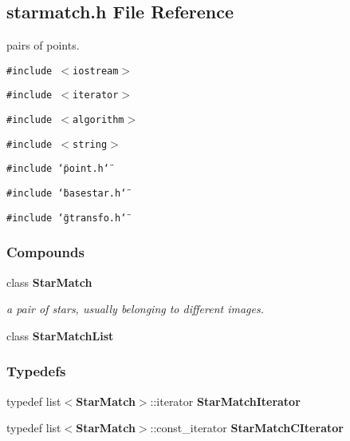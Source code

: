 \subsection{starmatch.h File Reference}
\label{starmatch_h}
pairs of points. 


{\tt \#include $<$iostream$>$}\par
{\tt \#include $<$iterator$>$}\par
{\tt \#include $<$algorithm$>$}\par
{\tt \#include $<$string$>$}\par
{\tt \#include \char`\"{}point.h\char`\"{}}\par
{\tt \#include \char`\"{}basestar.h\char`\"{}}\par
{\tt \#include \char`\"{}gtransfo.h\char`\"{}}\par
\subsubsection*{Compounds}
\begin{CompactItemize}
\item 
class {\bf Star\-Match}
\begin{CompactList}\small\item\em a pair of stars, usually belonging to different images.\item\end{CompactList}\item 
class {\bf Star\-Match\-List}
\end{CompactItemize}
\subsubsection*{Typedefs}
\begin{CompactItemize}
\item 
{}
typedef list$<${\bf Star\-Match}$>$::iterator {\bf Star\-Match\-Iterator}\label{starmatch_h_a0}

\item 
{}
typedef list$<${\bf Star\-Match}$>$::const\_\-iterator {\bf Star\-Match\-CIterator}\label{starmatch_h_a1}

\end{CompactItemize}
